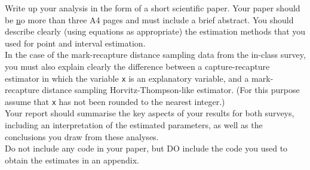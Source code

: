 Write up your analysis in the form of a short scientific paper. Your paper should be {\underline no more than three A4 pages} and must include a brief abstract. You should describe clearly (using equations as appropriate) the estimation methods that you used for point and interval estimation. \\

In the case of the mark-recapture distance sampling data from the in-class survey, you must also explain clearly the difference between a capture-recapture estimator in which the variable \verb|x| is an explanatory variable, and a mark-recapture distance sampling Horvitz-Thompson-like estimator. (For this purpose assume that \verb|x| has not been rounded to the nearest integer.) \\

Your report should summarise the key aspects of your results for both surveys, including an interpretation of the estimated parameters, as well as the conclusions you draw from these analyses. \\

Do not include any code in your paper, but DO include the code you used to obtain the estimates in an appendix. 
